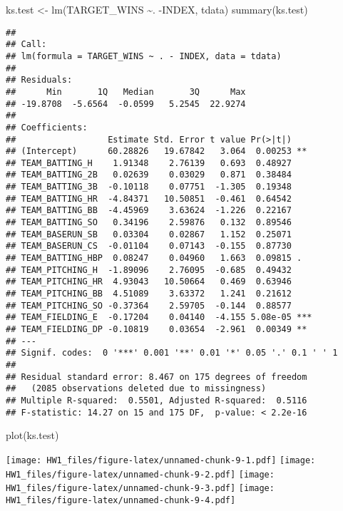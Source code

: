 \documentclass[
]{article}
\newenvironment{Shaded}{\begin{snugshade}}{\end{snugshade}}
\newcommand{\FunctionTok}[1]{\textcolor[rgb]{0.00,0.00,0.00}{#1}}
\newcommand{\NormalTok}[1]{#1}
\newcommand{\OtherTok}[1]{\textcolor[rgb]{0.56,0.35,0.01}{#1}}
\newcommand{\SpecialCharTok}[1]{\textcolor[rgb]{0.00,0.00,0.00}{#1}}
\begin{document}
\begin{Shaded}
\begin{Highlighting}[]
\NormalTok{ks.test }\OtherTok{\textless{}{-}} \FunctionTok{lm}\NormalTok{(TARGET\_WINS }\SpecialCharTok{\textasciitilde{}}\NormalTok{. }\SpecialCharTok{{-}}\NormalTok{INDEX, tdata)}
\FunctionTok{summary}\NormalTok{(ks.test)}
\end{Highlighting}
\end{Shaded}

\begin{verbatim}
## 
## Call:
## lm(formula = TARGET_WINS ~ . - INDEX, data = tdata)
## 
## Residuals:
##      Min       1Q   Median       3Q      Max 
## -19.8708  -5.6564  -0.0599   5.2545  22.9274 
## 
## Coefficients:
##                  Estimate Std. Error t value Pr(>|t|)    
## (Intercept)      60.28826   19.67842   3.064  0.00253 ** 
## TEAM_BATTING_H    1.91348    2.76139   0.693  0.48927    
## TEAM_BATTING_2B   0.02639    0.03029   0.871  0.38484    
## TEAM_BATTING_3B  -0.10118    0.07751  -1.305  0.19348    
## TEAM_BATTING_HR  -4.84371   10.50851  -0.461  0.64542    
## TEAM_BATTING_BB  -4.45969    3.63624  -1.226  0.22167    
## TEAM_BATTING_SO   0.34196    2.59876   0.132  0.89546    
## TEAM_BASERUN_SB   0.03304    0.02867   1.152  0.25071    
## TEAM_BASERUN_CS  -0.01104    0.07143  -0.155  0.87730    
## TEAM_BATTING_HBP  0.08247    0.04960   1.663  0.09815 .  
## TEAM_PITCHING_H  -1.89096    2.76095  -0.685  0.49432    
## TEAM_PITCHING_HR  4.93043   10.50664   0.469  0.63946    
## TEAM_PITCHING_BB  4.51089    3.63372   1.241  0.21612    
## TEAM_PITCHING_SO -0.37364    2.59705  -0.144  0.88577    
## TEAM_FIELDING_E  -0.17204    0.04140  -4.155 5.08e-05 ***
## TEAM_FIELDING_DP -0.10819    0.03654  -2.961  0.00349 ** 
## ---
## Signif. codes:  0 '***' 0.001 '**' 0.01 '*' 0.05 '.' 0.1 ' ' 1
## 
## Residual standard error: 8.467 on 175 degrees of freedom
##   (2085 observations deleted due to missingness)
## Multiple R-squared:  0.5501, Adjusted R-squared:  0.5116 
## F-statistic: 14.27 on 15 and 175 DF,  p-value: < 2.2e-16
\end{verbatim}

\begin{Shaded}
\begin{Highlighting}[]
\FunctionTok{plot}\NormalTok{(ks.test)}
\end{Highlighting}
\end{Shaded}

\texttt{[image: HW1\_files/figure-latex/unnamed-chunk-9-1.pdf]}
\texttt{[image: HW1\_files/figure-latex/unnamed-chunk-9-2.pdf]}
\texttt{[image: HW1\_files/figure-latex/unnamed-chunk-9-3.pdf]}
\texttt{[image: HW1\_files/figure-latex/unnamed-chunk-9-4.pdf]}
\end{document}

